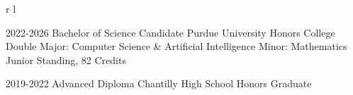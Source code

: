 \documentclass[
	10pt, %
]{FreemanCV}
\begin{document}
\begin{paracol}{2}
\begin{supertabular}{r l}

	\qualificationentry
		{2022-2026} %
		{Bachelor of Science Candidate} %
		{Purdue University Honors College} %
		{Double Major: Computer Science \& Artificial Intelligence} %
		{Minor: Mathematics}
		{Junior Standing, 82 Credits} %


	\qualificationentry
		{2019-2022} %
		{Advanced Diploma} %
		{Chantilly High School} %
		{} %
		{}
		{Honors Graduate} %


\end{supertabular}












\end{paracol}
\end{document}
